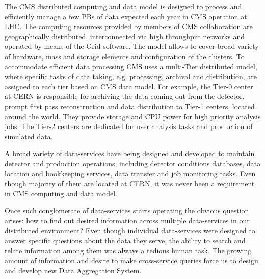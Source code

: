 \documentclass[1p,times]{elsarticle}
\begin{document}
The CMS distributed computing and data model \cite{CMSDataModel} 
is designed to process
and efficiently manage a few PBs of data expected each year
in CMS operation at LHC. The computing resources provided by members of CMS
collaboration are geographically distributed, 
interconnected via high throughput networks and operated by means 
of the Grid software. The model allows to cover broad variety of
hardware, mass and storage elements and configuration of the
clusters. To accommodate efficient data processing CMS uses
a multi-Tier distributed model, where specific tasks of data taking,
e.g. processing, archival and distribution, are assigned to each tier based
on CMS data model. For example, the Tier-0 center at CERN is responsible
for archiving the data coming out from the detector, prompt first pass reconstruction
and data distribution to Tier-1 centers, located around the world.
They provide storage and CPU power for high priority analysis jobs.
The Tier-2 centers
are dedicated for user analysis tasks and production of simulated data.

A broad variety of data-services have being designed and developed to
maintain detector and production operations, including detector
conditions databases, data location and bookkeeping services,
data transfer and job monitoring tasks. Even though majority of them
are located at CERN, it was never been a requirement in CMS computing
and data model. 

Once such conglomerate of data-services starts operating the obvious
question arises: how to find out desired information across multiple data-services
in our distributed environment? Even though individual data-services were designed
to answer specific questions about the data they serve, the ability to search and relate
information among them was always a tedious human task. The growing amount of information
and desire to make cross-service queries force us to design and develop new
Data Aggregation System.
\end{document}
